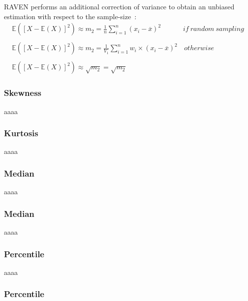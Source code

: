 RAVEN performs an additional correction of variance to obtain an unbiased estimation  with respect to the sample-size~\cite{RimoldiniUnbiased}:
\begin{equation}
\begin{matrix}
\mathbb{E}\left(\left[X - \mathbb{E}(X)\right]^{2}\right)  \approx  m_{2} = \frac{1}{n} \sum_{i=1}^{n}  (x_{i} - \overline{x})^{2} & if \: random \: sampling \\ 
\\ 
\mathbb{E}\left(\left[X - \mathbb{E}(X)\right]^{2}\right)  \approx m_{2}  = \frac{1}{V_{1}} \sum_{i=1}^{n} w_{i} \times (x_{i} - \overline{x})^{2}  & \, otherwise
\\
\\
\mathbb{E}\left(\left[X - \mathbb{E}(X)\right]^{2}\right)  \approx \sqrt{m_{2}}  =  \sqrt{m_{2}}
\end{matrix}
\end{equation}




\subsubsection{Skewness}
aaaa
\subsubsection{Kurtosis}

aaaa
\subsubsection{Median}

aaaa
\subsubsection{Median}
aaaa
\subsubsection{Percentile}


aaaa
\subsubsection{Percentile}


